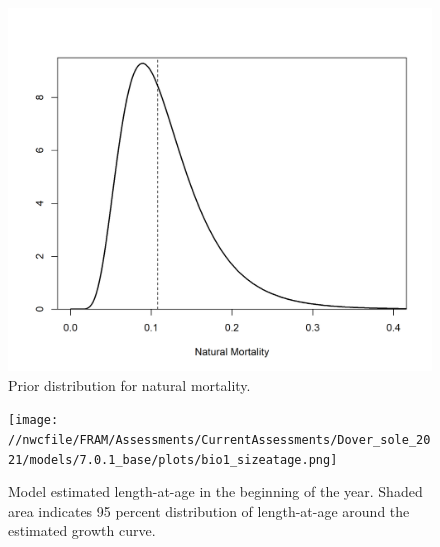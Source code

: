 \documentclass[11pt,
  english,
  a4paper,
]{article}
\begin{document}
\begin{figure}
\centering
\includegraphics[width=1\textwidth,height=1\textheight]{figs/M_prior.png}
\caption{Prior distribution for natural mortality.\label{fig:m-prior}}
\end{figure}

\tagmcend\tagstructend


\begin{figure}
\centering
\texttt{[image: //nwcfile/FRAM/Assessments/CurrentAssessments/Dover\_sole\_2021/models/7.0.1\_base/plots/bio1\_sizeatage.png]}
\caption{Model estimated length-at-age in the beginning of the year. Shaded area indicates 95 percent distribution of length-at-age around the estimated growth curve.\label{fig:mod-est-len-age}}
\end{figure}

\tagmcend\tagstructend

\end{document}
